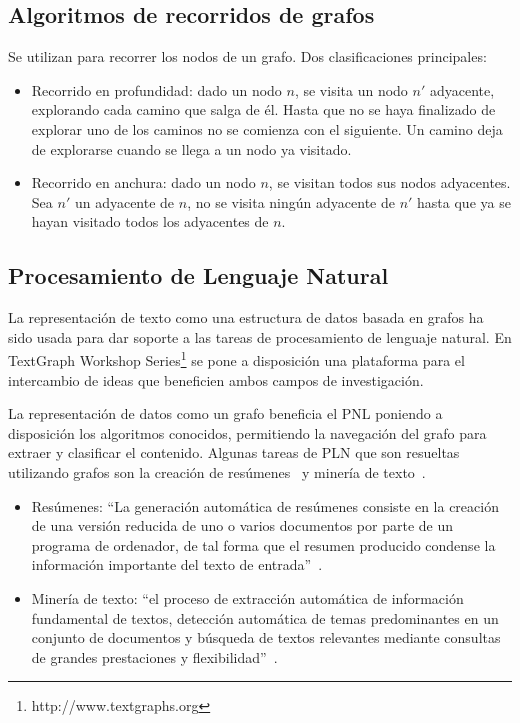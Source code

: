 \subsection{Algoritmos de recorridos de grafos}
Se utilizan para recorrer los nodos de un grafo. Dos clasificaciones principales:
\begin{itemize}
    \item Recorrido en profundidad: dado un nodo $n$, se visita un nodo $n'$ adyacente, explorando cada camino que salga de él. Hasta que no se haya finalizado de explorar uno de los caminos no se comienza con el siguiente. Un camino deja de explorarse cuando se llega a un nodo ya visitado. 
    \item Recorrido en anchura: dado un nodo $n$, se visitan todos sus nodos adyacentes. Sea $n'$ un adyacente de $n$, no se visita ningún adyacente de $n'$ hasta que ya se hayan visitado todos los adyacentes de $n$. 
\end{itemize}

\subsection{Procesamiento de Lenguaje Natural}
La representación de texto como una estructura de datos basada en grafos ha sido usada para dar soporte a las tareas de procesamiento de lenguaje natural. En TextGraph Workshop Series\footnote{http://www.textgraphs.org} se pone a disposición una plataforma para el intercambio de ideas que beneficien ambos campos de investigación. 

La representación de datos como un grafo beneficia el PNL poniendo a disposición los algoritmos conocidos, permitiendo la navegación del grafo para extraer y clasificar el contenido. Algunas tareas de PLN que son resueltas utilizando grafos son la creación de resúmenes~\cite{mihalcea2004graph}\cite{erkan2004lexrank} y minería de texto~\cite{Jin:2007:GTR:1244002.1244182}\cite{beliga2015overview}.

\begin{itemize}
    \item Resúmenes: ``La generación automática de resúmenes consiste en la creación de una versión reducida de uno o varios documentos por parte de un programa de ordenador, de tal forma que el resumen producido condense la información importante del texto de entrada''~\cite{plaza2011uso}.
    \item Minería de texto: ``el proceso de extracción automática de información fundamental de textos,  detección  automática  de temas  predominantes en un conjunto de documentos y búsqueda de textos relevantes mediante consultas de grandes prestaciones y flexibilidad''~\cite{brun2004articulo}.
\end{itemize}

